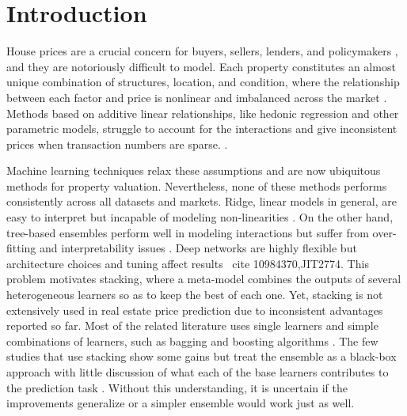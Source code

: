 \documentclass[conference]{IEEEtran}
\begin{document}
\section{Introduction}
House prices are a crucial concern for buyers, sellers, lenders, and policymakers \cite{KOK2014136}, and they are notoriously difficult to model. Each property constitutes an almost unique combination of structures, location, and condition, where the relationship between each factor and price is nonlinear and imbalanced across the market \cite{35659ca8-6be8-375a-94eb-6f497d2fc083}. Methods based on additive linear relationships, like hedonic regression and other parametric models, struggle to account for the interactions and give inconsistent prices when transaction numbers are sparse.  \cite{KOK2014136}.

Machine learning techniques relax these assumptions and are now ubiquitous methods for property valuation. Nevertheless, none of these methods performs consistently across all datasets and markets. Ridge, linear models in general, are easy to interpret but incapable of modeling non-linearities \cite{limsombunchao2004house}. On the other hand, tree-based ensembles perform well in modeling interactions but suffer from over-fitting and interpretability issues \cite{fan2006determinants,RICOJUAN2021114590} . Deep networks are highly flexible but architecture choices and tuning affect results \ cite {10984370,JIT2774}. This problem motivates stacking, where a meta-model combines the outputs of several heterogeneous learners so as to keep the best of each one. Yet, stacking is not extensively used in real estate price prediction due to inconsistent advantages reported so far\cite{land13091436}. Most of the related literature uses single learners and simple combinations of learners, such as bagging and boosting algorithms \cite{RICOJUAN2021114590}. The few studies that use stacking show some gains but treat the ensemble as a black-box approach with little discussion of what each of the base learners contributes to the prediction task \cite{Bjrgve2025ComparingHV} . Without this understanding, it is uncertain if the improvements generalize or a simpler ensemble would work just as well.
\end{document}
